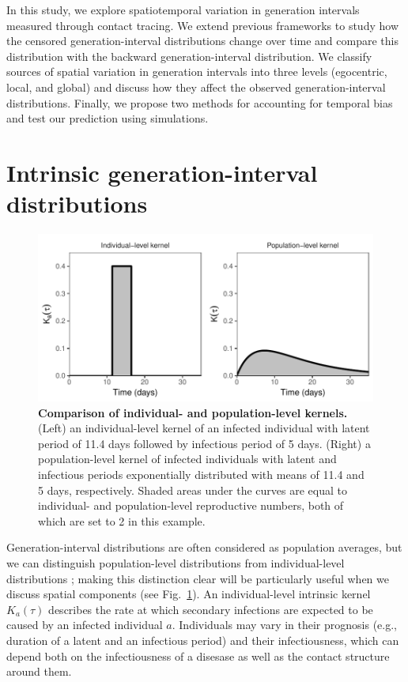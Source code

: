 \documentclass[12pt]{article}
\newcommand{\fref}[1]{Fig.~\ref{fig:#1}}
\begin{document}
In this study, we explore spatiotemporal variation in generation intervals measured through contact tracing.
We extend previous frameworks to study how the censored generation-interval distributions change over time and compare this distribution with the backward generation-interval distribution.
We classify sources of spatial variation in generation intervals into three levels (egocentric, local, and global) and discuss how they affect the observed generation-interval distributions.
Finally, we propose two methods for accounting for temporal bias and test our prediction using simulations.

\section{Intrinsic generation-interval distributions}

\begin{figure}[!pbth]
\includegraphics[width=\textwidth]{../fig/individual_and_population.pdf}
\caption{\textbf{Comparison of individual- and population-level kernels.}
(Left) an individual-level kernel of an infected individual with latent period of 11.4 days followed by infectious period of 5 days. 
(Right) a population-level kernel of infected individuals with latent and infectious periods exponentially distributed with means of 11.4 and 5 days, respectively. 
Shaded areas under the curves are equal to individual- and population-level reproductive numbers, both of which are set to 2 in this example.
}
\label{fig:indpop}

\end{figure}

Generation-interval distributions are often considered as population averages, but we can distinguish population-level distributions from individual-level distributions \citep{svensson2007note, svensson2015influence}; 
making this distinction clear will be particularly useful when we discuss spatial components (see \fref{indpop}).
An individual-level intrinsic kernel $K_a(\tau)$ describes the rate at which secondary infections are expected to be caused by an infected individual $a$.
Individuals may vary in their prognosis (e.g., duration of a latent and an infectious period) and their infectiousness, which can depend both on the infectiousness of a disesase as well as the contact structure around them.
\end{document}
